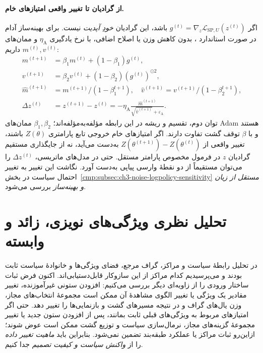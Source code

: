 \paragraph{از گرادیان تا تغییر واقعی امتیازهای خام.}
اگر $g^{(t)}=\nabla_z\mathcal L_{\mathrm{SP},U}(z^{(t)})$
باشد، این گرادیان \emph{خودِ آپدیت} نیست.
برای بهینه‌ساز آدام در صورت استاندارد
\cite{KingmaBa2015Adam}، بدون کاهش وزن یا اصلاح اضافی، با
نرخ یادگیری $\eta_{\mathrm A}$ و ممان‌های $m^{(t)},v^{(t)}$ داریم:
\begin{equation}\label{cmp:eq:ch3-adam-logit-update}
\boxed{
\begin{aligned}
m^{(t+1)}&=\beta_1m^{(t)}+(1-\beta_1)g^{(t)},\\
v^{(t+1)}&=\beta_2v^{(t)}+(1-\beta_2)(g^{(t)})^{\odot2},\\
\widehat m^{(t+1)}&=m^{(t+1)}/(1-\beta_1^{t+1}),\quad
\widehat v^{(t+1)}=v^{(t+1)}/(1-\beta_2^{t+1}),\\
\Delta z^{(t)}&=z^{(t+1)}-z^{(t)}
=-\eta_{\mathrm A}
\frac{\widehat m^{(t+1)}}{\sqrt{\widehat v^{(t+1)}}+
\varepsilon_{\mathrm A}} .
\end{aligned}}
\end{equation}
توان دوم، تقسیم و ریشه در این رابطه مؤلفه‌به‌مؤلفه‌اند؛
$\beta_1,\beta_2$ ممان‌های Adam هستند و
با $\beta$ توقف گشت تفاوت دارند.
اگر امتیازهای خام خروجی تابع پارامتری $Z(\theta)$ باشند،
تغییر واقعی از $Z(\theta^{(t+1)})-Z(\theta^{(t)})$
به‌دست می‌آید، نه از جایگذاری مستقیم گرادیان $z$
در فرمول مخصوص پارامتر مستقل.
حتی در مدل‌های ماتریسی، $\Delta z^{(t)}$ را می‌توان
مستقیماً از دو نقطهٔ وارسی پیاپی به‌دست آورد.
نگاشت این تغییر به تغییر احتمال سیاست
در بخش~\ref{cmp:subsec:ch3-noise-logpolicy-sensitivity}
\emph{مستقل از زیان و بهینه‌ساز} بررسی می‌شود.

\section{تحلیل نظری ویژگی‌های نویزی، زائد و وابسته}
\label{cmp:sec:ch3-noise-feature-analysis}
\label{cmp:sec:ch3-noise-and-outliers}%
در تحلیل رابطهٔ سیاست و مراکز،
گراف مرجع، فضای ویژگی‌ها و
خانوادهٔ سیاست ثابت بودند و
می‌پرسیدیم کدام مراکز از
این سازوکار قابل‌دستیابی‌اند.
اکنون فرض ثبات ساختار ورودی
را از زاویه‌ای دیگر بررسی
می‌کنیم: افزودن ستونی غیرآموزنده،
تغییر مقادیر یک ویژگی یا تغییر
الگوی مشاهدهٔ آن ممکن است
مجموعهٔ انتخاب‌های مجاز،
وزن یال‌های گراف و در نتیجه
مسیرهای گشت و بازنمایی‌ها
را تغییر دهد. حتی اگر امتیازهای مربوط
به ویژگی‌های قبلی ثابت بمانند،
پس از افزودن ستون جدید یا
تغییر مجموعهٔ گزینه‌های مجاز،
نرمال‌سازی سیاست و توزیع گشت
ممکن است عوض شوند؛ ازاین‌رو
ثبات مراکز یا عملکرد طبقه‌بند
تضمین نمی‌شود.
بنابراین باید \emph{ماهیت تغییر
داده} را از \emph{واکنش سیاست
و کیفیت تصمیم} جدا کنیم.

